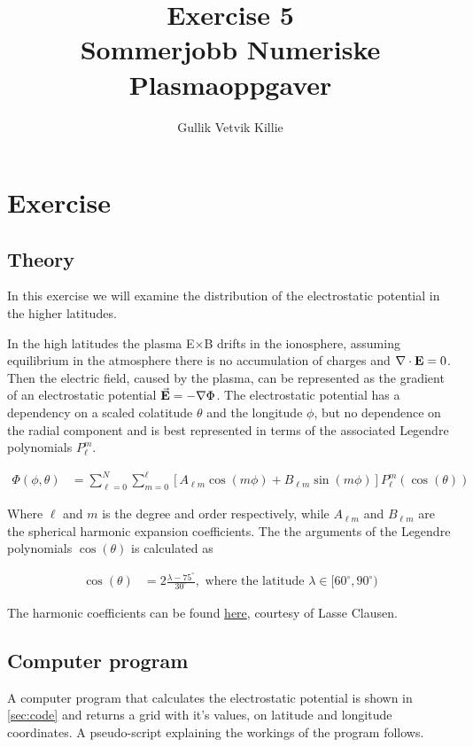 \documentclass[x11names]{article}
\title{ Exercise 5 \\ Sommerjobb Numeriske Plasmaoppgaver }
\author{Gullik Vetvik Killie
		}
\begin{document}
\maketitle

\section{Exercise}

\subsection{Theory}
  In this exercise we will examine the distribution of the electrostatic potential in the higher latitudes.

  In the high latitudes the plasma E\(\times\)B drifts in the ionosphere, assuming equilibrium in the atmosphere there is no accumulation of charges and \(\nabla\cdot\vb{E} = 0\). Then the electric field, caused by the plasma, can be represented as the gradient of an electrostatic potential \(\va{E} = - \nabla\Phi\). The electrostatic potential has a dependency on a scaled colatitude \(\theta\) and the longitude \(\phi\), but no dependence on the radial component and is best represented in terms of the associated Legendre polynomials \(P^m_\ell\).

  \begin{align}
    \Phi(\phi ,\theta) &= \sum^N_{\ell = 0}\sum^\ell_{m= 0} \left[ A_{\ell m}\cos(m \phi) + B_{\ell m}\sin(m \phi) \right] P^m_\ell(\cos(\theta))   \label{eq:phi_sum}
  \end{align}

  Where \(\ell\) and \(m\) is the degree and order respectively, while \(A_{\ell m}\) and \(B_{\ell m}\) are the spherical harmonic expansion coefficients. The the arguments of the Legendre polynomials \(\cos(\theta)\) is calculated as

  \begin{align}
    \cos(\theta) &= 2\frac{\lambda - 75^\circ}{30^\circ}, \text{  where the latitude }  \lambda \in [ 60^\circ, 90^\circ )
  \end{align}

  The harmonic coefficients can be found \href{http://folk.uio.no/lbnc/fys3610/heppner_coeffs.txt}{here}, courtesy of Lasse Clausen.


  \subsection{Computer program}
      A computer program that calculates the electrostatic potential is shown in \cref{sec:code} and returns a grid with it's values, on latitude and longitude coordinates. A pseudo-script explaining the workings of the program follows.
\end{document}
